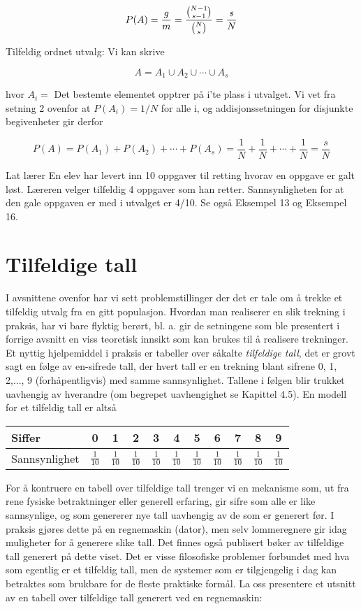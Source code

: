 \[ P(A)=\frac{g}{m}=\frac{{{N-1}\choose{s-1}}}{{{N}\choose{s}}}=\frac{s}{N} \]

\noindent Tilfeldig ordnet utvalg: Vi kan skrive

\[ A=A_1 \cup A_2 \cup \cdots \cup A_s \]

\noindent hvor $A_i=$ Det bestemte elementet opptrer på i'te plass i
utvalget. Vi vet fra setning 2 ovenfor at $P(A_i)=1/N$ for alle
i, og addisjonssetningen for disjunkte begivenheter gir derfor

\[ P(A)=P(A_1)+P(A_2)+ \cdots +P(A_s)=
           \frac{1}{N}+\frac{1}{N}+ \cdots +\frac{1}{N}=\frac{s}{N} \]                   

\begin{eksempel}{Lat lærer}
En elev har levert inn 10 oppgaver til retting hvorav en oppgave
er galt løst. Læreren velger tilfeldig 4 oppgaver som han retter.
Sannsynligheten for at den gale oppgaven er med i utvalget er
4/10. Se også Eksempel 13 og Eksempel 16.
\end{eksempel}

\section{Tilfeldige tall}

I avsnittene ovenfor har vi sett problemstillinger der det er
tale om å trekke et tilfeldig utvalg fra en gitt populasjon.
Hvordan man realiserer en slik trekning i praksis, har vi bare
flyktig berørt, bl. a. gir de setningene som ble presentert i
forrige avsnitt en viss teoretisk innsikt som kan brukes til å
realisere trekninger. Et nyttig hjelpemiddel i praksis er
tabeller over såkalte {\em tilfeldige tall}, det er grovt sagt en
følge av en-sifrede tall, der hvert tall er en trekning blant
sifrene 0, 1, 2,..., 9 (forhåpentligvis) med samme sannsynlighet.
Tallene i følgen blir trukket uavhengig av hverandre (om begrepet
uavhengighet se Kapittel 4.5). En modell for et tilfeldig tall er
altså
\begin{center}
\renewcommand{\arraystretch}{1.3}
\begin{tabular}{l|cccccccccc}
Siffer&0&1&2&3&4&5&6&7&8&9 \\ \hline
Sannsynlighet&$\frac{1}{10}$&$\frac{1}{10}$&$\frac{1}{10}$&$\frac{1}{10}$
     &$\frac{1}{10}$&$\frac{1}{10}$&$\frac{1}{10}$&$\frac{1}{10}$
     &$\frac{1}{10}$&$\frac{1}{10}$
\end{tabular}
\end{center}
For å kontruere en tabell over tilfeldige tall trenger vi en
mekanisme som, ut fra rene fysiske betraktninger eller generell
erfaring, gir sifre som alle er like sannsynlige, og som
genererer nye tall uavhengig av de som er generert før. I praksis
gjøres dette på en regnemaskin (dator), men selv lommeregnere
gir idag  muligheter for å
generere slike tall. Det finnes også publisert bøker av
tilfeldige tall generert på dette viset. Det er visse filosofiske
problemer forbundet med hva som egentlig er et tilfeldig tall,
men de systemer som er tilgjengelig i dag kan betraktes som
brukbare for de fleste praktiske formål. La oss presentere et
utsnitt av en tabell over tilfeldige tall generert ved en
regnemaskin:

